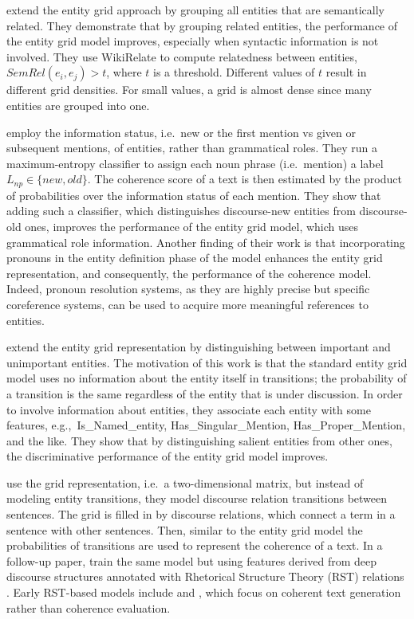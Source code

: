  extend the entity grid approach by grouping all entities that are semantically related.  
They demonstrate that by grouping related entities, the performance of the entity grid model improves, especially when syntactic information is not involved. 
They use WikiRelate \cite{strube.aaai06} to compute relatedness between entities, $SemRel(e_i,e_j) >t$, where $t$ is a threshold.
Different values of $t$ result in different grid densities. 
For small values, a grid is almost dense since many entities are grouped into one.  

 employ the information status, i.e.\ new or the first mention vs given or subsequent mentions, of entities, rather than grammatical roles. 
They run a maximum-entropy classifier to assign each noun phrase (i.e.\ mention) a label $L_{np} \in \lbrace new, old \rbrace$. 
The coherence score of a text is then estimated by the product of probabilities over the information status of each mention. 
They show that adding such a classifier, which distinguishes discourse-new entities from discourse-old ones, improves the performance of the entity grid model, which uses grammatical role information.  
Another finding of their work is that incorporating pronouns in the entity definition phase of the model enhances the entity grid representation, and consequently, the performance of the coherence model. 
Indeed, pronoun resolution systems, as they are highly precise but specific coreference systems, can be used to acquire more meaningful references to entities. 

 extend the entity grid representation by distinguishing between important and unimportant entities. 
The motivation of this work is that the standard entity grid model uses no information about the entity itself in transitions; the probability of a transition is the same regardless of the entity that is under discussion. 
In order to involve information about entities, they associate each entity with some features, e.g.,\ Is\_Named\_entity, Has\_Singular\_Mention, Has\_Proper\_Mention, and the like. 
They show that by distinguishing salient entities from other ones, the discriminative performance of the entity grid model improves. 

 use the grid representation, i.e.\ a two-dimensional matrix, but instead of modeling entity transitions, they model discourse relation transitions between sentences. 
The grid is filled in by discourse relations, which connect a term in a sentence with other sentences. 
Then, similar to the entity grid model the probabilities of transitions are used to represent the coherence of a text. 
In a follow-up paper,  train the same model but using features derived from deep discourse structures annotated with Rhetorical Structure Theory (RST) relations \cite{mann88,prasad08a}. 
Early RST-based models include  and , which focus on coherent text generation rather than coherence evaluation. 

